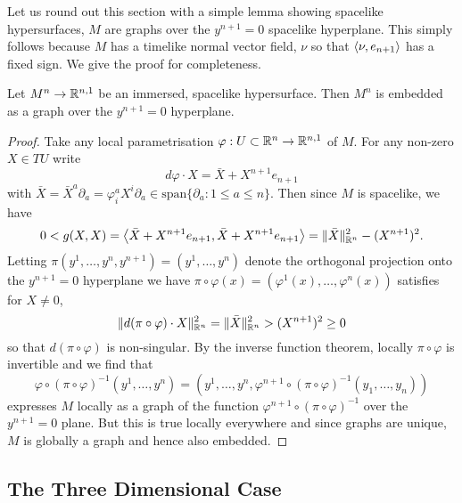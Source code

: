 \documentclass[a4paper, 12pt]{amsart}
\begin{document}
Let us round out this section with a simple lemma showing spacelike hypersurfaces, \(M\) are graphs over the \(y^{n+1} = 0\) spacelike hyperplane. This simply follows because \(M\) has a timelike normal vector field, \(\nu\) so that \(\left\langle \nu,e_{n+1} \right\rangle\) has a fixed sign. We give the proof for completeness.
\begin{lemma}
\label{lem:graph}
Let \(M^n \to \mathbb{R}^{n,1}\) be an immersed, spacelike hypersurface. Then \(M^n\) is embedded as a graph over the \(y^{n+1} = 0\) hyperplane.
\end{lemma}
\begin{proof}
Take any local parametrisation \(\varphi : U \subset \mathbb{R}^n \to \mathbb{R}^{n,1}\) of \(M\). For any non-zero \(X \in TU\) write
\[
d\varphi \cdot X = \bar{X} + X^{n+1} e_{n+1}
\]
with \(\bar{X} = \bar{X}^a \partial_a = \varphi^a_i X^i \partial_a \in \text{span} \{\partial_a : 1 \leq a \leq n\}\). Then since \(M\) is spacelike, we have
\[
0 < g(X, X) = \left\langle \bar{X} + X^{n+1} e_{n+1},\bar{X} + X^{n+1} e_{n+1} \right\rangle = \|\bar{X}\|_{\mathbb{R}^n}^2 - (X^{n+1})^2.
\]
Letting \(\pi(y^1, \ldots, y^n, y^{n+1}) = (y^1, \ldots, y^n)\) denote the orthogonal projection onto the \(y^{n+1} = 0\) hyperplane we have \(\pi \circ \varphi (x) = (\varphi^1(x), \ldots, \varphi^n(x))\) satisfies for \(X \ne 0\),
\[
\|d(\pi \circ \varphi) \cdot X\|_{\mathbb{R}^n}^2 = \|\bar{X}\|_{\mathbb{R}^n}^2  > (X^{n+1})^2 \geq 0
\]
so that \(d(\pi \circ \varphi)\) is non-singular. By the inverse function theorem, locally \(\pi \circ \varphi\) is invertible and we find that
\[
\varphi \circ (\pi \circ \varphi)^{-1} (y^1, \ldots, y^n) = (y^1, \ldots, y^n, \varphi^{n+1} \circ (\pi \circ \varphi)^{-1} (y_1, \ldots, y_n))
\]
expresses \(M\) locally as a graph of the function \(\varphi^{n+1} \circ (\pi \circ \varphi)^{-1}\) over the \(y^{n+1} = 0\) plane. But this is true locally everywhere and since graphs are unique, \(M\) is globally a graph and hence also embedded.
\end{proof}
\subsection{The Three Dimensional Case}
\label{subsec:notation_threedim}
\end{document}
